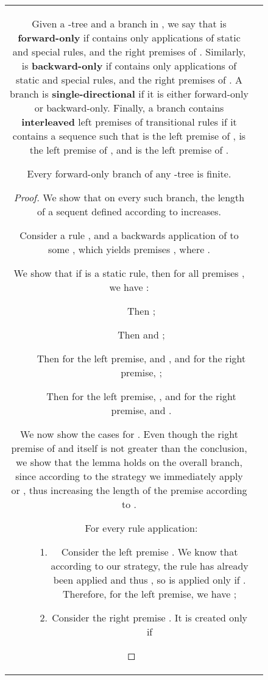 \documentclass{llncs}
\numberwithin{equation}{section}
\begin{document}
\begin{figure}[t]
\begin{tabular}{cc}
\begin{definition}[LEN]
\end{definition}

\begin{definition}
Given a -tree  and a branch  in , we say that  is \textbf{forward-only} if  contains only applications of static and special rules,  and the right premises of . Similarly,  is \textbf{backward-only} if  contains only applications of static and special rules,  and the right premises of . A branch is \textbf{single-directional} if it is either forward-only or backward-only. Finally, a branch contains \textbf{interleaved} left premises of transitional rules if it contains a sequence  such that  is the left premise of ,  is the left premise of , and  is the left premise of .
\end{definition}

\begin{lemma}\label{forwardOnlyFinite}
Every forward-only branch of any -tree is finite.
\end{lemma}
\begin{proof}
We show that on every such branch, the length of a sequent defined according to  increases.

Consider a rule , and a backwards application of  to some , which yields  premises , where .

We show that if  is a static rule, then for all premises , we have :
\begin{description}
	\item[\rm{, , :}] Then ;
	\item[\rm{:}] Then  and ;	
	\item[\rm{:}] Then for the left premise,  and , and for the right premise, ;
	\item[\rm{:}] Then for the left premise, , and for the right premise,  and .
\end{description}

We now show the cases for .
Even though the right premise of  and  itself is not greater than the conclusion, we show that the lemma holds on the overall  branch, since according to the strategy we immediately apply  or , thus increasing the length of the premise according to .
\begin{description}
	\item[\rm{:}] For every  rule application:
		\begin{enumerate} 
			\item Consider the left premise . We know that according to our strategy, the  rule has already been applied and thus , so  is applied only if . Therefore, for the left premise, we have ;
			\item\label{rightPremImp} Consider the right premise . It is created only if


\end{enumerate}
\end{description}
\end{proof}
\end{tabular}
\end{figure}
\end{document}
